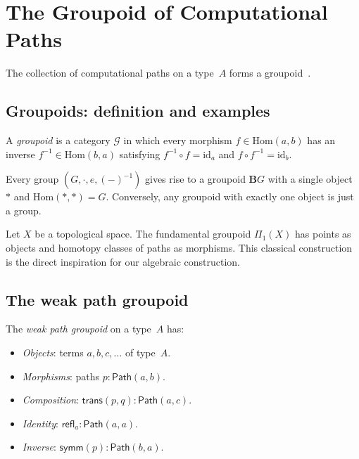 \documentclass[manuscript]{BSLstyle}
\newcommand{\Path}{\mathsf{Path}}
\newcommand{\refl}{\mathsf{refl}}
\newcommand{\symm}{\mathsf{symm}}
\newcommand{\trans}{\mathsf{trans}}
\begin{document}
\section{The Groupoid of Computational Paths}\label{sec:groupoid}

The collection of computational paths on a type~$A$ forms a
groupoid~\cite{RamosDeQueirozDeOliveira2015,deVerasRamosDeQueirozDeOliveira2023}.

\subsection{Groupoids: definition and examples}

\begin{definition}[Groupoid]\label{def:groupoid}
A \emph{groupoid} is a category $\mathcal{G}$ in which every morphism
$f \in \mathrm{Hom}(a, b)$ has an inverse $f^{-1} \in \mathrm{Hom}(b, a)$
satisfying $f^{-1} \circ f = \mathrm{id}_a$ and $f \circ f^{-1} = \mathrm{id}_b$.
\end{definition}

\begin{example}\label{ex:group-groupoid}
Every group $(G, \cdot, e, (-)^{-1})$ gives rise to a groupoid
$\mathbf{B}G$ with a single object $\ast$ and $\mathrm{Hom}(\ast, \ast) = G$.
Conversely, any groupoid with exactly one object is just a group.
\end{example}

\begin{example}\label{ex:fund-grpd-top}
Let $X$ be a topological space.  The fundamental groupoid $\Pi_1(X)$
has points as objects and homotopy classes of paths as morphisms.
This classical construction~\cite{Hatcher02,May99} is the direct
inspiration for our algebraic construction.
\end{example}

\subsection{The weak path groupoid}

\begin{definition}\label{def:weak-groupoid}
The \emph{weak path groupoid} on a type~$A$ has:
\begin{itemize}
\item \emph{Objects}: terms $a, b, c, \ldots$ of type~$A$.
\item \emph{Morphisms}: paths $p : \Path(a, b)$.
\item \emph{Composition}: $\trans(p, q) : \Path(a, c)$.
\item \emph{Identity}: $\refl_a : \Path(a, a)$.
\item \emph{Inverse}: $\symm(p) : \Path(b, a)$.
\end{itemize}
\end{definition}
\end{document}

